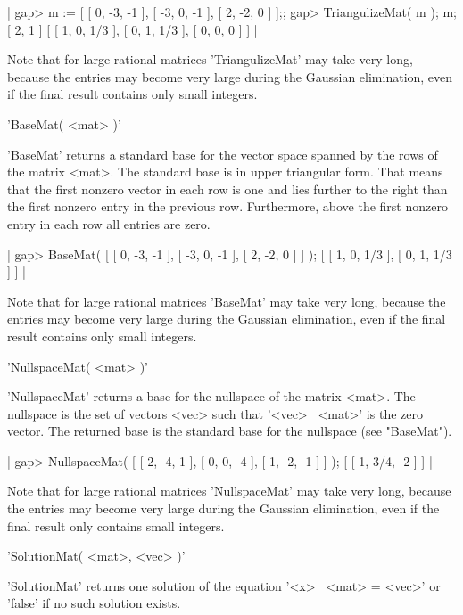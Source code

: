 |    gap> m := [ [ 0, -3, -1 ], [ -3, 0, -1 ], [ 2, -2, 0 ] ];;
    gap> TriangulizeMat( m ); m;
    [ 2, 1 ]
    [ [ 1, 0, 1/3 ], [ 0, 1, 1/3 ], [ 0, 0, 0 ] ] |

Note  that for large rational matrices 'TriangulizeMat' may take very long,
because  the entries may become very large during the Gaussian elimination,
even if the final result contains only small integers.


'BaseMat( <mat> )'

'BaseMat'  returns a  standard  base for the vector space  spanned by the
rows of the matrix <mat>.  The standard base is in upper triangular form.
That means that  the  first nonzero vector in each  row  is  one and lies
further to the right than  the first nonzero  entry in the previous  row.
Furthermore, above  the  first  nonzero entry in each row all entries are
zero.

|    gap> BaseMat( [ [ 0, -3, -1 ], [ -3, 0, -1 ], [ 2, -2, 0 ] ] );
    [ [ 1, 0, 1/3 ], [ 0, 1, 1/3 ] ] |

Note that  for  large  rational  matrices 'BaseMat'  may take very  long,
because  the  entries   may  become   very  large   during  the  Gaussian
elimination, even if the final result contains only small integers.


'NullspaceMat( <mat> )'

'NullspaceMat' returns a base for the nullspace of the matrix <mat>.  The
nullspace is the set of vectors <vec> such that '<vec> \*\ <mat>'  is the
zero vector.   The returned  base is the standard  base for the nullspace
(see "BaseMat").

|    gap> NullspaceMat( [ [ 2, -4, 1 ], [ 0, 0, -4 ], [ 1, -2, -1 ] ] );
    [ [ 1, 3/4, -2 ] ] |

Note that for large rational matrices 'NullspaceMat' may take very  long,
because   the   entries   may  become  very  large  during  the  Gaussian
elimination, even if the final result only contains small integers.


'SolutionMat( <mat>, <vec> )'

'SolutionMat'  returns  one solution  of the equation '<x>  \*\  <mat>  =
<vec>' or 'false' if no such solution exists.

